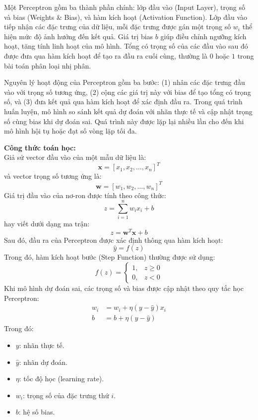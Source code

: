 \documentclass[12pt,a4paper]{report}
\begin{document}
Một Perceptron gồm ba thành phần chính: lớp đầu vào (Input Layer), trọng số và bias (Weights \& Bias), và hàm kích hoạt (Activation Function). Lớp đầu vào tiếp nhận các đặc trưng của dữ liệu, mỗi đặc trưng được gán một trọng số $w_i$ thể hiện mức độ ảnh hưởng đến kết quả. Giá trị bias $b$ giúp điều chỉnh ngưỡng kích hoạt, tăng tính linh hoạt của mô hình. Tổng có trọng số của các đầu vào sau đó được đưa qua hàm kích hoạt để tạo ra đầu ra cuối cùng, thường là $0$ hoặc $1$ trong bài toán phân loại nhị phân. 

Nguyên lý hoạt động của Perceptron gồm ba bước: (1) nhân các đặc trưng đầu vào với trọng số tương ứng, (2) cộng các giá trị này với bias để tạo tổng có trọng số, và (3) đưa kết quả qua hàm kích hoạt để xác định đầu ra. Trong quá trình huấn luyện, mô hình so sánh kết quả dự đoán với nhãn thực tế và cập nhật trọng số cùng bias khi dự đoán sai. Quá trình này được lặp lại nhiều lần cho đến khi mô hình hội tụ hoặc đạt số vòng lặp tối đa.

\textbf{Công thức toán học:} \\
Giả sử vector đầu vào của một mẫu dữ liệu là:
\begin{equation}
    \mathbf{x} = [x_1, x_2, \dots, x_n]^T
\end{equation}
và vector trọng số tương ứng là:
\begin{equation}
    \mathbf{w} = [w_1, w_2, \dots, w_n]^T
\end{equation}
Giá trị đầu vào của nơ-ron được tính theo công thức:
\begin{equation}
    z = \sum_{i=1}^n w_i x_i + b
\end{equation}
hay viết dưới dạng ma trận:
\begin{equation}
    z = \mathbf{w}^T \mathbf{x} + b
\end{equation}
Sau đó, đầu ra của Perceptron được xác định thông qua hàm kích hoạt:
\begin{equation}
    \hat{y} = f(z)
\end{equation}
Trong đó, hàm kích hoạt bước (Step Function) thường được sử dụng:
\begin{equation}
    f(z) = \begin{cases} 1, & z \ge 0 \\ 0, & z < 0 \end{cases}
\end{equation}
Khi mô hình dự đoán sai, các trọng số và bias được cập nhật theo quy tắc học Perceptron:
\begin{align}
    w_i &= w_i + \eta(y - \hat{y})x_i \\
    b &= b + \eta(y - \hat{y})
\end{align}
Trong đó:
\begin{itemize}
    \item $y$: nhãn thực tế.
    \item $\hat{y}$: nhãn dự đoán.
    \item $\eta$: tốc độ học (learning rate).
    \item $w_i$: trọng số của đặc trưng thứ $i$.
    \item $b$: hệ số bias.
\end{itemize}
\end{document}

